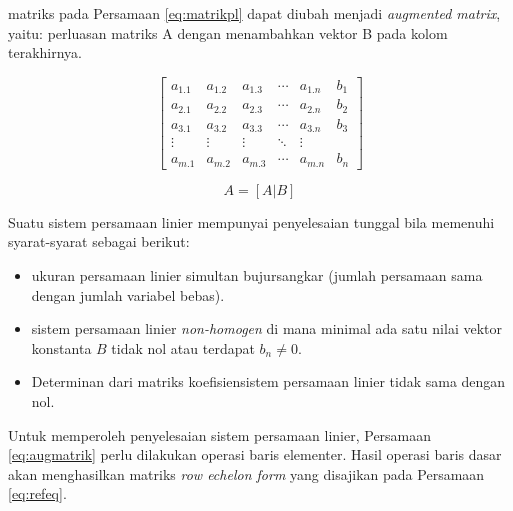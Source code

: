 \documentclass[]{book}
\providecommand{\tightlist}{%
  \setlength{\itemsep}{0pt}\setlength{\parskip}{0pt}}
\theoremstyle{definition}
\theoremstyle{definition}
\theoremstyle{definition}
\theoremstyle{remark}
\let\BeginKnitrBlock\begin \let\EndKnitrBlock\end
\begin{document}
matriks pada Persamaan \eqref{eq:matrikpl} dapat diubah menjadi \emph{augmented matrix}, yaitu: perluasan matriks A dengan menambahkan vektor B pada kolom terakhirnya.

\begin{equation}
\begin{bmatrix}
     a_{1.1} & a_{1.2} & a_{1.3} &\cdots& a_{1.n} & b_1     \\[0.3em]
     a_{2.1} & a_{2.2} & a_{2.3} &\cdots& a_{2.n} & b_2     \\[0.3em]
     a_{3.1} & a_{3.2} & a_{3.3} &\cdots& a_{3.n} & b_3     \\[0.3em]
     \vdots  & \vdots  & \vdots &\ddots& \vdots            \\[0.3em]
     a_{m.1} & a_{m.2} & a_{m.3} &\cdots& a_{m.n} & b_n
     \end{bmatrix}
  \label{eq:augmatrik}
\end{equation}

\begin{equation}
A=\left[A|B\right]
  \label{eq:augmatrik2}
\end{equation}

\BeginKnitrBlock{theorem}[spltheorem]
\protect\hypertarget{thm:unnamed-chunk-134}{}{\label{thm:unnamed-chunk-134} {} }Suatu sistem persamaan linier mempunyai penyelesaian tunggal bila memenuhi syarat-syarat sebagai berikut:
\EndKnitrBlock{theorem}

\begin{itemize}
\tightlist
\item
  ukuran persamaan linier simultan bujursangkar (jumlah persamaan sama dengan jumlah variabel bebas).
\item
  sistem persamaan linier \emph{non-homogen} di mana minimal ada satu nilai vektor konstanta \(B\) tidak nol atau terdapat \(b_{n}\neq 0\).
\item
  Determinan dari matriks koefisiensistem persamaan linier tidak sama dengan nol.
\end{itemize}

Untuk memperoleh penyelesaian sistem persamaan linier, Persamaan \eqref{eq:augmatrik} perlu dilakukan operasi baris elementer. Hasil operasi baris dasar akan menghasilkan matriks \emph{row echelon form} yang disajikan pada Persamaan \eqref{eq:refeq}.
\end{document}

